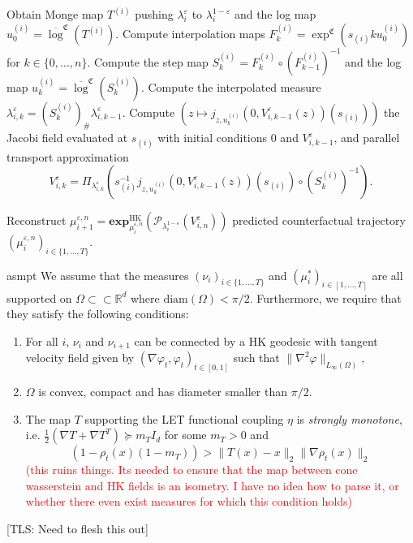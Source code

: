 \documentclass[11pt]{article}
\newcommand{\tls}[1]{{\color{cyan}[TLS: #1]}}
\begin{document}
\begin{algorithm}[h]
\begin{algorithmic}[1]
            \State Obtain Monge map $T^{(i)}$ pushing $ \lambda^{\varepsilon}_{i}$ to $\lambda^{1-\varepsilon}_{i}$ and the log map $u^{(i)}_0 = \overline{\log}^\mathfrak{C}(T^{(i)})$.
            \State Compute interpolation maps $F_k^{(i)} = \exp^{\mathfrak{C}}(s_{(i)}ku_0^{(i)})$ for $k \in \{0, \dots, n\}$.
                \State Compute the step map $S_k^{(i)} = F_k^{(i)} \circ (F_{k-1}^{(i)})^{-1}$ and the log map $u_k^{(i)} = \overline{\log}^{\mathfrak{C}}(S_k^{(i)})$.
                \State Compute the interpolated measure $\lambda_{i, k}^{\varepsilon} = (S_{k}^{(i)})_\# \lambda_{i, k-1}^{\varepsilon}$.
                \State Compute $\left(z \mapsto j_{z, u_k^{(i)}}(0, V_{i, k-1}^\varepsilon(z))(s_{(i)})\right)$ the Jacobi field evaluated at $s_{(i)}$ with initial \hspace*{\algorithmicindent}\hspace*{\algorithmicindent}conditions $0$ and $V^\varepsilon_{i, k-1}$, and parallel transport approximation
                \[V_{i, k}^\varepsilon = \Pi_{\lambda_{i, k}^\varepsilon}\left(s_{(i)}^{-1}j_{z, u_k^{(i)}}(0, V_{i, k-1}^\varepsilon(z))(s_{(i)}) \circ (S_k^{(i)})^{-1}\right).\]
                
            \EndFor
            \State Reconstruct $\mu_{i + 1}^{\varepsilon, n} = \mathbf{exp}_{\mu_i^{\varepsilon, n}}^{\text{HK}}(\mathcal{P}_{\lambda_i^{1-\varepsilon}}(V_{i, n}^\varepsilon))$
        \EndFor
    \State \Return predicted counterfactual trajectory $(\mu_i^{\varepsilon, n})_{i \in \{1, \dots, T\}}$.
    \end{algorithmic}
\end{algorithm} 

\begin{restatable}{asmpt}{} \label{all necessary HK assumptions}
    We assume that the measures $(\nu_i)_{i \in \{1, \dots, T\}}$ and $(\mu_i^*)_{i \in [1, \dots, T]}$ are all supported on $\Omega \subset \subset \mathbb{R}^d$ where $\text{diam}(\Omega) < \pi/2$. Furthermore, we require that they satisfy the following conditions:
    \begin{enumerate}
        \item For all $i$, $\nu_{i}$ and $\nu_{i+1}$ can be connected by a HK geodesic with tangent velocity field given by $(\nabla\varphi_t, \varphi_t)_{t \in [0, 1]}$ such that $\|\nabla^2\varphi\|_{L_\infty(\Omega)}, $
        \item $\Omega$ is convex, compact and has diameter smaller than $\pi/2$. 
        \item The map $T$ supporting the LET functional coupling $\eta$ is \textit{strongly monotone}, i.e. $\frac{1}{2}(\nabla T + \nabla T^T) \succeq m_T I_d$ for some $m_T > 0$ and
        \[(1 - \rho_t(x)(1 - m_T)) > \|T(x) - x\|_2 \|\nabla\rho_t(x)\|_2 \]
        \textcolor{red}{(this ruins things. Its needed to ensure that the map between cone wasserstein and HK fields is an isometry. I have no idea how to parse it, or whether there even exist measures for which this condition holds)}
    \end{enumerate}
    \tls{Need to flesh this out}
\end{restatable}
\end{document}
